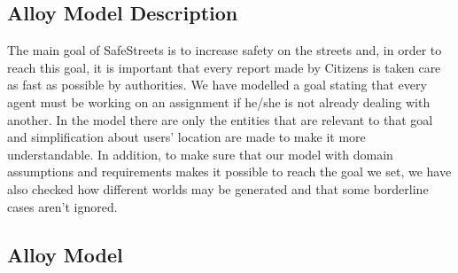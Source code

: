 \subsection{Alloy Model Description}
The main goal of SafeStreets is to increase safety on the streets and, in order to reach this goal, it is important
that every report made by Citizens is taken care as fast as possible by authorities. We have modelled
a goal stating that every agent must be working on an assignment if he/she is not already dealing with
another. In the model there are only the entities that are relevant to that goal and simplification about
users’ location are made to make it more understandable. In addition, to make sure that our model
with domain assumptions and requirements makes it possible to reach the goal we set, we have also checked how different worlds may be generated and that some borderline cases aren’t ignored.

\subsection{Alloy Model}


\newpage
